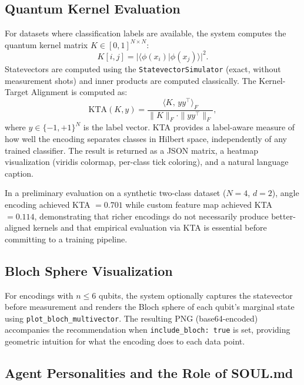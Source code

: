 \documentclass[sigconf,nonacm]{acmart}
\begin{document}
\subsection{Quantum Kernel Evaluation}

For datasets where classification labels are available, the system computes the
quantum kernel matrix $K \in [0,1]^{N \times N}$:
\begin{equation}
  K[i,j] = |\langle\phi(x_i)|\phi(x_j)\rangle|^2.
\end{equation}
Statevectors are computed using the \texttt{StatevectorSimulator} (exact, without
measurement shots) and inner products are computed classically. The
Kernel-Target Alignment is computed as:
\begin{equation}
  \mathrm{KTA}(K, y)
  = \frac{\langle K,\, yy^{\top} \rangle_F}
         {\|K\|_F \cdot \|yy^{\top}\|_F},
\end{equation}
where $y \in \{-1, +1\}^N$ is the label vector. KTA provides a label-aware measure
of how well the encoding separates classes in Hilbert space, independently of any
trained classifier. The result is returned as a JSON matrix, a heatmap visualization
(viridis colormap, per-class tick coloring), and a natural language caption.

In a preliminary evaluation on a synthetic two-class dataset ($N=4$, $d=2$), angle
encoding achieved KTA $= 0.701$ while custom feature map achieved KTA $= 0.114$,
demonstrating that richer encodings do not necessarily produce better-aligned kernels
and that empirical evaluation via KTA is essential before committing to a training
pipeline.

\subsection{Bloch Sphere Visualization}

For encodings with $n \leq 6$ qubits, the system optionally captures the statevector
before measurement and renders the Bloch sphere of each qubit's marginal state using
\texttt{plot\_bloch\_\allowbreak multivector}. The resulting PNG (base64-encoded)
accompanies the recommendation when \texttt{include\_bloch:\,true} is set, providing
geometric intuition for what the encoding does to each data point.

\subsection{Agent Personalities and the Role of SOUL.md}
\end{document}
